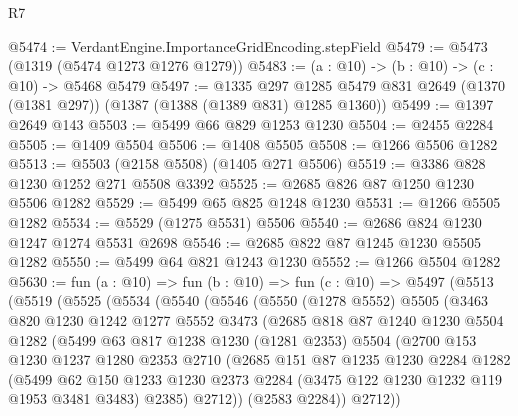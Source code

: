 \begin{lexlean}{R7}
\begin{coremodule}
@5474 := VerdantEngine.ImportanceGridEncoding.stepField
@5479 := @5473 (@1319 (@5474 @1273 @1276 @1279))
@5483 := (a : @10) -> (b : @10) -> (c : @10) -> @5468 @5479
@5497 := @1335
    @297
    @1285
    @5479
    @831
    @2649
    (@1370 (@1381 @297))
    (@1387 (@1388 (@1389 @831) @1285 @1360))
@5499 := @1397 @2649 @143
@5503 := @5499 @66 @829 @1253 @1230
@5504 := @2455 @2284
@5505 := @1409 @5504
@5506 := @1408 @5505
@5508 := @1266 @5506 @1282
@5513 := @5503 (@2158 @5508) (@1405 @271 @5506)
@5519 := @3386 @828 @1230 @1252 @271 @5508 @3392
@5525 := @2685 @826 @87 @1250 @1230 @5506 @1282
@5529 := @5499 @65 @825 @1248 @1230
@5531 := @1266 @5505 @1282
@5534 := @5529 (@1275 @5531) @5506
@5540 := @2686 @824 @1230 @1247 @1274 @5531 @2698
@5546 := @2685 @822 @87 @1245 @1230 @5505 @1282
@5550 := @5499 @64 @821 @1243 @1230
@5552 := @1266 @5504 @1282
@5630 := fun (a : @10) =>
  fun (b : @10) =>
  fun (c : @10) =>
  @5497
    (@5513
      (@5519
        (@5525
          (@5534
            (@5540
              (@5546
                (@5550
                  (@1278 @5552)
                  @5505
                  (@3463
                    @820
                    @1230
                    @1242
                    @1277
                    @5552
                    @3473
                    (@2685
                      @818
                      @87
                      @1240
                      @1230
                      @5504
                      @1282
                      (@5499
                        @63
                        @817
                        @1238
                        @1230
                        (@1281 @2353)
                        @5504
                        (@2700
                          @153
                          @1230
                          @1237
                          @1280
                          @2353
                          @2710
                          (@2685
                            @151
                            @87
                            @1235
                            @1230
                            @2284
                            @1282
                            (@5499
                              @62
                              @150
                              @1233
                              @1230
                              @2373
                              @2284
                              (@3475 @122 @1230 @1232 @119 @1953 @3481 @3483)
                              @2385)
                            @2712))
                        (@2583 @2284))
                      @2712))

\end{coremodule}
\end{lexlean}
